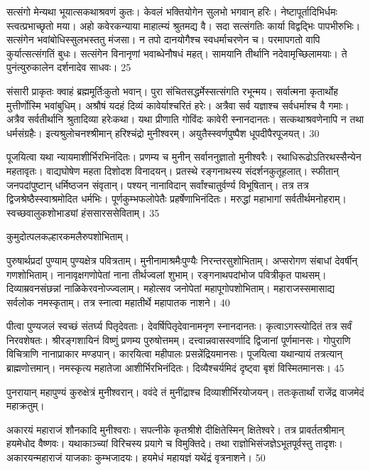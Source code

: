 सत्संगो मेन्यथा भूयात्सकथाश्रवणं कुतः।
केवलं भक्तियोगेन सुलभो भगवान् हरिः।
नेष्टापूर्तादिभिर्धमः स्त्वत्प्रभाच्छृतो मया।
अहो कवेरकन्याया माहात्म्यं श्रुतमद्य वै।
सदा सत्संगतिः कार्या विद्वद्भिः पापभीरुभिः।
सत्संगेन भवांबोधिस्सुलभस्ततु मंजसा।
न तपो दानयोगैश्च स्वधर्माचरणेन च।
परमापगतो वापि कुर्यात्सत्संगतिं बुधः।
सत्संगेन विनानृणां भवाब्धेनौषधं महत्।
सामयानि तीर्थानि नदेवामृच्छिलामयाः।
ते पुनंत्युरुकालेन दर्शनादेव साधवः।
25


संसारी प्राकृतः क्वाहं ब्रह्ममूर्तिःकुतो भवान्।
पुरा संचितसद्धर्मेस्सत्संगति रभून्मय।
सर्वात्मना कृतार्थोह मुत्तीर्णोस्मि भवांबुधिम्।
अश्रौषं यदहं दिव्यं कावेर्याश्चरितं हरेः।
अत्रैवा सर्व यज्ञाश्च सर्वधर्माश्च वै गमाः।
अत्रैव सर्वतीर्थानि श्रुतादिव्या हरेःकथा।
यथा प्रीणाति गोविंदः कावेरी स्नानदानतः।
सत्कथाश्रवणेनापि न तथा धर्मसंग्रहैः।
इत्यश्रुलोचनश्श्रीमान् हरिश्चंद्रो मुनीश्वरम्।
अयुतैस्स्वर्णपुष्पैश धूपदीपैरपूजयत्।
30

पूजयित्वा यथा न्यायमाशीर्भिरभिनंदितः।
प्रणम्य च मुनीन् सर्वाननुज्ञातो मुनीश्वरैः।
रथाधिरूढोऽतिरथस्सैन्येन महतावृतः।
वाद्यघोषेण महता दिशोदश विनादयन्।
प्रतस्थे रङ्गनाथस्य संदर्शनकुतूहलात्।
स्फीतान् जनपदांपुष्टान् धर्मिष्ठजन संवृतान्।
पश्यन् नानाविदान् सर्वांश्चातुर्वर्ण्य विभूषितान्।
तत्र तत्र द्विजश्रेष्ठैस्स्वाश्रमोदित धर्मभिः।
पूर्णकुम्भफलोपेतैः प्रहर्षेणाभिनंदितः।
मरुद्धां महाभागां सर्वतीर्थमनोहराम्।
स्वच्छवालुकशोभाड्यां हंससारससेविताम्।
35

कुमुदोत्पलकल्हारकमलैरुपशोभिताम्।

पुरुषार्थप्रदां पुण्याम् पुण्यक्षेत्र पवित्रताम्।
मुनीनामाश्रमैःपुण्यैः निरन्तरसुशोभिताम्।
अप्सरोगण संबाधां देवर्षीन् गणशोभिताम्।
नानावृक्षगणोपेतां नाना तीर्थज्वलां शुभाम्।
रङ्गनाथपदांभोज पवित्रीकृत पाथसम्।
दिव्याम्रवनसंछन्नां नाळिकेरवनोज्ज्वलाम्।
महोत्सव जनोपेतां महापूगोपशोभिताम्।
महाराजस्समासाद्य सर्वलोक नमस्कृताम्।
तत्र स्नात्वा महातीर्थे महापातक नाशने।
40

पीत्वा पुण्यजलं स्वच्छं संतर्घ्य पितृदेवताः।
देवर्षिपितृदेवानामनृण स्नानदानतः।
कृत्वाऽगस्त्योदितं तत्र सर्वं निरवशेषतः।
श्रीरङ्गशायिनं विष्णुं प्रणम्य पुरुषोत्तमम्।
दत्त्वान्नवासस्वर्णादि द्विजानां पूर्णमानसः।
गोपुराणि विचित्राणि नानाप्राकार मण्डपान्।
कारयित्वा महीपालः प्रसन्नेंद्रियमानसः।
पूजयित्वा यथान्यायं तत्रत्यान् ब्राह्मणोत्तमान्।
नमस्कृत्य महातेजा आशीर्भिरभिनंदितः।
दिव्यैश्चर्यमिदं दृष्ट्वा बृशं विस्मितमानसः।
45

पुनरायान् महापुण्यं कुरुक्षेत्रं मुनीश्वरान्।
ववंदे तं मुनींद्राश्च दिव्याशीर्भिरयोजयन्।
ततःकृतार्थां राजेंद्र वाजमेदं महाक्रतुम्।

अकारयं महाराजं शौनकादि मुनीश्वराः।
सपत्नीके कृतश्रीशे दीक्षितेस्मिन् क्षितेश्वरे।
तत्र प्रावर्ततश्रीमान् हयमेधोद वैष्णवः।
यथाकाञ्च्यां विरिचस्य प्रयागे च विमुक्तिदे।
तथा राज्ञोभिसंजज्ञेऽभूतपूर्वस्तु तादृशः।
अकारयन्महाराजं याजकाः कुम्भजादयः।
हयमेधं महायज्ञं यथेंद्रं वृत्रनाशने।
50

